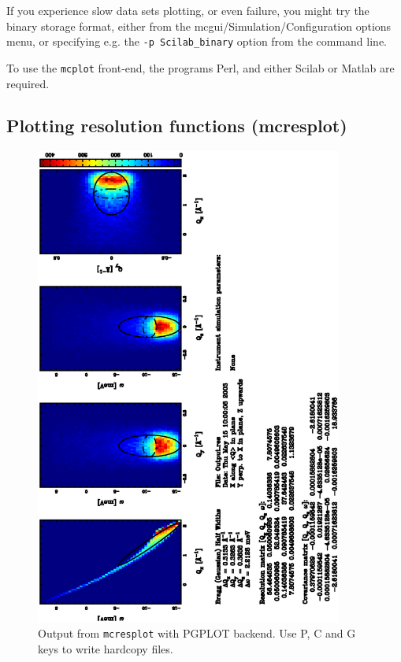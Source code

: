 If you experience slow data sets plotting, or even failure, you might try the binary storage format, either from the mcgui/Simulation/Configuration options menu, or specifying e.g. the \verb+-p Scilab_binary+ option from the command line.

To use the \verb+mcplot+ front-end, the programs Perl, and either Scilab or Matlab are required.  


\subsection{Plotting resolution functions (mcresplot)}
\label{s:mcresplot}

\begin{figure}[htb!]
  \begin{center}
    \includegraphics[angle=-90,width=0.9\textwidth]{figures/mcresplot_PGPLOT.ps}
  \end{center}
\caption{Output from \texttt{mcresplot} with PGPLOT backend.
  Use P, C and G keys to write hardcopy files.}
\label{fig:mcresplot_PGPLOT}
\end{figure}

